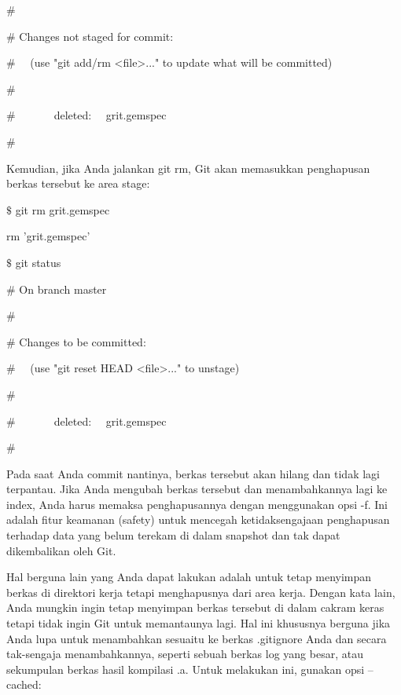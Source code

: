 \noindent 
 $  \#  $ \par
\noindent 
 $  \#  $ Changes not staged for commit: \par
\noindent 
 $  \#  $~~ (use "git add/rm <file>..." to update what will be committed) \par
\noindent 
 $  \#  $ \par
\noindent 
 $  \#  $~~~~~~~deleted:~~  grit.gemspec \par
\noindent 
 $  \#  $ \par
\vspace{12pt}
\vspace{12pt}
\noindent 
Kemudian, jika Anda jalankan git rm, Git akan memasukkan penghapusan berkas tersebut ke area stage: \par
\vspace{12pt}
\noindent 
 $  \$  $ git rm grit.gemspec \par
\noindent 
rm 'grit.gemspec' \par
\noindent 
 $  \$  $ git status \par
\noindent 
 $  \#  $ On branch master \par
\noindent 
 $  \#  $ \par
\noindent 
 $  \#  $ Changes to be committed: \par
\noindent 
 $  \#  $~~ (use "git reset HEAD <file>..." to unstage) \par
\noindent 
 $  \#  $ \par
\noindent 
 $  \#  $~~~~~~~deleted:~~  grit.gemspec \par
\noindent 
 $  \#  $ \par
\vspace{12pt}
\vspace{12pt}
\noindent 
Pada saat Anda commit nantinya, berkas tersebut akan hilang dan tidak lagi terpantau. Jika Anda mengubah berkas tersebut dan menambahkannya lagi ke index, Anda harus memaksa penghapusannya dengan menggunakan opsi -f. Ini adalah fitur keamanan (safety) untuk mencegah ketidaksengajaan penghapusan terhadap data yang belum terekam di dalam snapshot dan tak dapat dikembalikan oleh Git. \par
\noindent 
Hal berguna lain yang Anda dapat lakukan adalah untuk tetap menyimpan berkas di direktori kerja tetapi menghapusnya dari area kerja. Dengan kata lain, Anda mungkin ingin tetap menyimpan berkas tersebut di dalam cakram keras tetapi tidak ingin Git untuk memantaunya lagi. Hal ini khususnya berguna jika Anda lupa untuk menambahkan sesuaitu ke berkas .gitignore Anda dan secara tak-sengaja menambahkannya, seperti sebuah berkas log yang besar, atau sekumpulan berkas hasil kompilasi .a. Untuk melakukan ini, gunakan opsi --cached: \par
